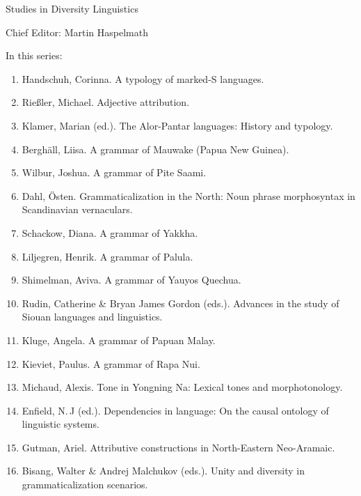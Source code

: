 {\large Studies in Diversity Linguistics}

\bigskip

Chief Editor: Martin Haspelmath 

\bigskip

In this series:

\begin{enumerate}
\item Handschuh, Corinna. A typology of marked-S languages.
\item Rießler, Michael. Adjective attribution.
\item Klamer, Marian (ed.). The Alor-Pantar languages: History and typology.
\item Berghäll, Liisa. A grammar of Mauwake (Papua New Guinea).
\item Wilbur, Joshua. A grammar of Pite Saami.
\item Dahl, Östen. Grammaticalization in the North: Noun phrase morphosyntax in Scandinavian vernaculars.
\item Schackow, Diana.    A grammar of Yakkha.
\item Liljegren, Henrik. A grammar of Palula.
\item Shimelman, Aviva. A grammar of Yauyos Quechua. 
\item Rudin, Catherine \& Bryan James Gordon (eds.). Advances in the study of Siouan languages and linguistics.
\item Kluge, Angela. A grammar of Papuan Malay. 
\item Kieviet, Paulus. A grammar of Rapa Nui. 
\item Michaud, Alexis. Tone in Yongning Na: Lexical tones and morphotonology.
\item Enfield, N.\,J (ed.).  Dependencies in language: On the causal ontology of linguistic systems.
\item Gutman, Ariel. Attributive constructions in North-Eastern Neo-Aramaic.
\item Bisang, Walter \& Andrej Malchukov (eds.). Unity and diversity in grammaticalization scenarios.
 
\end{enumerate}



